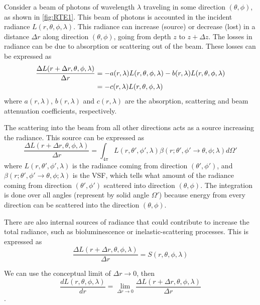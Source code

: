 Consider a beam of photons of wavelength $\lambda$ traveling in some direction $(\theta,\phi)$, as shown in \autoref{fig:RTE1}. This beam of photons is accounted in the incident radiance $L(r,\theta,\phi,\lambda)$. This radiance can increase (source) or decrease (lost) in a distance $\Delta r$ along direction  $(\theta,\phi)$, going from depth $z$ to $z+\Delta z$. The losses in radiance can be due to absorption or scattering out of the beam. These losses can be expressed as
\begin{align}\label{eq:RTE1}
  \frac{\Delta L(r+\Delta r,\theta,\phi,\lambda)}{\Delta r}&= -a(r,\lambda)L(r,\theta,\phi,\lambda)-b(r,\lambda)L(r,\theta,\phi,\lambda)\notag\\ 
  &= -c(r,\lambda)L(r,\theta,\phi,\lambda) 
\end{align}
where $a(r,\lambda)$, $b(r,\lambda)$ and $c(r,\lambda)$ are the absorption, scattering and beam attenuation coefficients, respectively. 

The scattering into the beam from all other directions acts as a source increasing the radiance. This source can be expressed as
\begin{equation}\label{eq:RTE2}
\frac{\Delta L(r+\Delta r,\theta,\phi,\lambda)}{\Delta r} = \int_{4\pi} L(r,\theta',\phi',\lambda)\beta(r;\theta',\phi' \to \theta,\phi;\lambda)d\Omega'
\end{equation}
where $L(r,\theta',\phi',\lambda)$ is the radiance coming from direction $(\theta',\phi')$, and $\beta(r;\theta',\phi' \to \theta,\phi;\lambda)$ is the VSF, which tells what amount of the radiance coming from direction $(\theta',\phi')$ scattered into direction $(\theta,\phi)$. The integration is done over all angles (represent by solid angle $\Omega'$) because energy from every direction can be scattered into the direction $(\theta,\phi)$.

There are also internal sources of radiance that could contribute to increase the total radiance, such as bioluminescence or inelastic-scattering processes. This is expressed as
\begin{equation}\label{eq:RTE3}
    \frac{\Delta L(r+\Delta r,\theta,\phi,\lambda)}{\Delta r} = S(r,\theta,\phi,\lambda)
\end{equation}

We can use the conceptual limit of $\Delta r\rightarrow 0$, then
\begin{equation}\label{eq:lim}
  \frac{dL(r,\theta,\phi,\lambda)}{dr} = \lim_{\Delta r \to 0} \frac{\Delta L(r+\Delta r,\theta,\phi,\lambda)}{\Delta r}
\end{equation}. 

